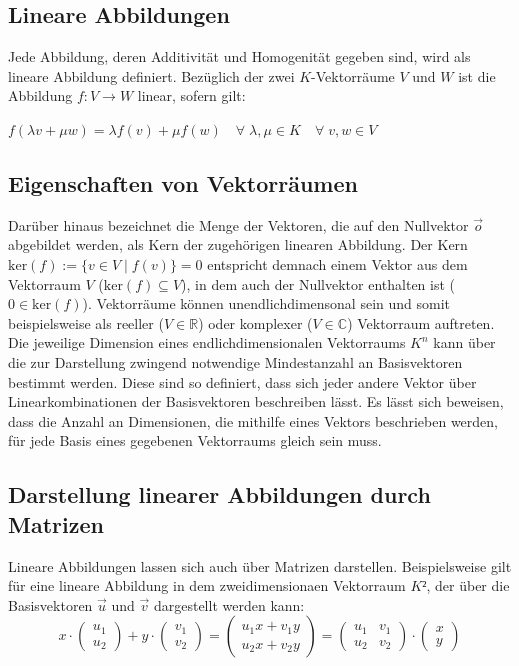 \documentclass[]{dsadokumentation}
\begin{document}
\subsection{Lineare Abbildungen}
Jede Abbildung, deren Additivität und Homogenität gegeben sind, wird als lineare Abbildung definiert. Bezüglich der zwei $K$-Vektorräume $V$ und $W$ ist die Abbildung $f: V \rightarrow W$ linear, sofern gilt:
\begin{center} $f(\lambda v + \mu w)=\lambda f(v) + \mu f(w) \quad \forall \; \lambda, \mu \in K \quad \forall \; v, w \in V$ \end{center}

\subsection{Eigenschaften von Vektorräumen}
Darüber hinaus bezeichnet die Menge der Vektoren, die auf den Nullvektor $\vec{o}$ abgebildet werden, als Kern der zugehörigen linearen Abbildung. Der Kern $\mathrm{ker}(f):= \{v \in V \; \big\vert \; f(v) \} = 0$ entspricht demnach einem Vektor aus dem Vektorraum $V$ ($\mathrm{ker}(f) \subseteq V$), in dem auch der Nullvektor enthalten ist ($0 \in \mathrm{ker}(f)$). Vektorräume können unendlichdimensonal sein und somit beispielsweise als reeller ($V \in \mathbb{R}$) oder komplexer ($V \in \mathbb{C}$) Vektorraum auftreten. Die jeweilige Dimension eines endlichdimensionalen Vektorraums $K^n$ kann über die zur Darstellung zwingend notwendige Mindestanzahl an Basisvektoren bestimmt werden. Diese sind so definiert, dass sich jeder andere Vektor über Linearkombinationen der Basisvektoren beschreiben lässt. Es lässt sich beweisen, dass die Anzahl an Dimensionen, die mithilfe eines Vektors beschrieben werden, für jede Basis eines gegebenen Vektorraums gleich sein muss.\\

\subsection{Darstellung linearer Abbildungen durch Matrizen}
Lineare Abbildungen lassen sich auch über Matrizen darstellen. Beispielsweise gilt für eine lineare Abbildung in dem zweidimensionaen Vektorraum $K²$, der über die Basisvektoren $\vec{u}$ und $\vec{v}$ dargestellt werden kann:
\[x \cdot \left(\begin{array}{c} u_1 \\ u_2 \end{array}\right) + y \cdot \left(\begin{array}{c} v_1 \\ v_2 \end{array}\right) = \left(\begin{array}{c} u_1 x + v_1 y \\ u_2 x + v_2 y \end{array}\right) = \left( \begin{array}{rr} u_1 & v_1 \\ u_2 & v_2 \end{array}\right) \cdot \left(\begin{array}{c} x \\ y \end{array}\right) \]
\end{document}
